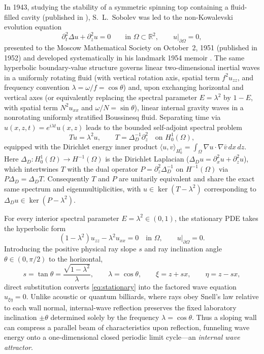 \documentclass[11pt,reqno]{amsart}
\theoremstyle{definition}
\theoremstyle{remark}
\newcommand{\R}{\mathbb{R}}
\begin{document}
In 1943, studying the stability of a symmetric spinning top containing a fluid-filled cavity (published in \cite{Sobolev1960}), S.~L.~Sobolev was led to the non-Kowalevski evolution equation
\begin{equation}\label{eq:sobolev-evol}
  \partial_t^2 \Delta u + \partial_z^2 u = 0 \qquad \text{in } \Omega \subset \R^2, \qquad u|_{\partial\Omega} = 0,
\end{equation}
presented to the Moscow Mathematical Society on October~2, 1951 (published in 1952) and developed systematically in his landmark 1954 memoir \cite{Sobolev1954}. The same hyperbolic boundary-value structure governs linear two-dimensional inertial waves in a uniformly rotating fluid (with vertical rotation axis, spatial term $f^2 u_{zz}$, and frequency convention $\lambda = \omega/f = \cos\theta$) and, upon exchanging horizontal and vertical axes (or equivalently replacing the spectral parameter $E = \lambda^2$ by $1 - E$, with spatial term $N^2 u_{xx}$ and $\omega/N = \sin\theta$), linear internal gravity waves in a nonrotating uniformly stratified Boussinesq fluid. Separating time via $u(x,z,t) = e^{i\lambda t} u(x,z)$ leads to the bounded self-adjoint spectral problem
\begin{equation}\label{eq:spectral}
  T u = \lambda^2 u, \qquad T = \Delta_D^{-1} \partial_z^2 \quad \text{on } H_0^1(\Omega),
\end{equation}
equipped with the Dirichlet energy inner product $\langle u, v \rangle_{H_0^1} = \int_\Omega \nabla u \cdot \nabla \bar v \, dx\,dz$. Here $\Delta_D \colon H_0^1(\Omega) \to H^{-1}(\Omega)$ is the Dirichlet Laplacian ($\Delta_D u = \partial_x^2 u + \partial_z^2 u$), which intertwines $T$ with the dual operator $P = \partial_z^2 \Delta_D^{-1}$ on $H^{-1}(\Omega)$ via $P \Delta_D = \Delta_D T$. Consequently $T$ and $P$ are unitarily equivalent and share the exact same spectrum and eigenmultiplicities, with $u \in \ker(T - \lambda^2)$ corresponding to $\Delta_D u \in \ker(P - \lambda^2)$.

For every interior spectral parameter $E = \lambda^2 \in (0,1)$, the stationary PDE takes the hyperbolic form
\begin{equation}\label{eq:stationary}
  (1 - \lambda^2) u_{zz} - \lambda^2 u_{xx} = 0 \quad \text{in } \Omega, \qquad u|_{\partial\Omega} = 0.
\end{equation}
Introducing the positive physical ray slope $s$ and ray inclination angle $\theta \in (0,\pi/2)$ to the horizontal,
\begin{equation}\label{eq:slope-conv}
  s = \tan\theta = \frac{\sqrt{1-\lambda^2}}{\lambda}, \qquad \lambda = \cos\theta, \qquad \xi = z + sx, \qquad \eta = z - sx,
\end{equation}
direct substitution converts \eqref{eq:stationary} into the factored wave equation $u_{\xi\eta} = 0$. Unlike acoustic or quantum billiards, where rays obey Snell's law relative to each wall normal, internal-wave reflection preserves the fixed laboratory inclination $\pm\theta$ determined solely by the frequency $\lambda = \cos\theta$. Thus a sloping wall can compress a parallel beam of characteristics upon reflection, funneling wave energy onto a one-dimensional closed periodic limit cycle---an \emph{internal wave attractor}.
\end{document}
